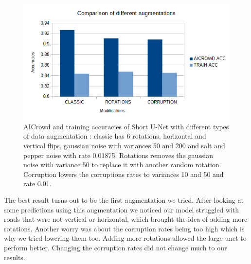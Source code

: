 \documentclass[10pt,conference,compsocconf]{IEEEtran}
\begin{document}
\begin{figure}[H]
    \centering
    \includegraphics[scale = 0.4]{report_images/data_graph.png} %
    \vspace{-0.15in}
    \caption{AICrowd and training accuracies of Short U-Net with different types of data augmentation : classic has 6 rotations, horizontal and vertical flips, gaussian noise with variances 50 and 200 and salt and pepper noise with rate 0.01875. Rotations removes the gaussian noise with variance 50 to replace it with another random rotation. Corruption lowers the corruptions rates to variances 10 and 50 and rate 0.01.}
\end{figure}
\vspace{-0.1in}
The best result turns out to be the first augmentation we tried. After looking at some predictions using this augmentation we noticed our model struggled with roads that were not vertical or horizontal, which brought the idea of adding more rotations. Another worry was about the corruption rates being too high which is why we tried lowering them too. Adding more rotations allowed the large unet to perform better. Changing the corruption rates did not change much to our results.
\end{document}
